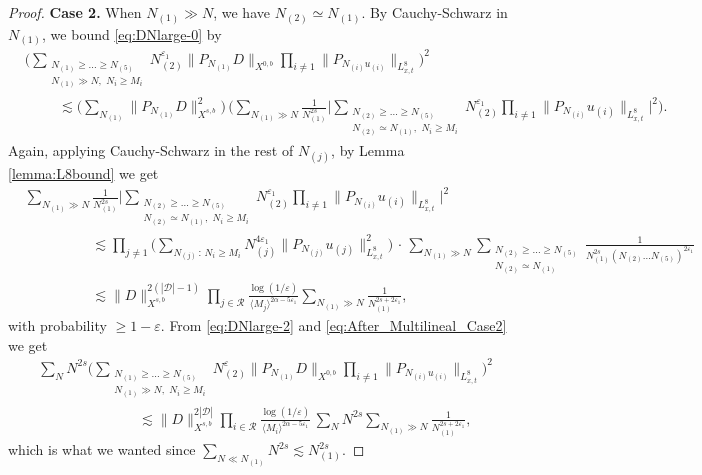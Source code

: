 \documentclass[11pt, xcolor = dvipsnames,reqno
]{amsart}
\theoremstyle{definition}
\theoremstyle{remark}
\begin{document}
\begin{proof}
\textbf{Case 2.}
When $N_{(1)} \gg N$, we have $N_{(2)} \simeq N_{(1)}$. By Cauchy-Schwarz in $N_{(1)}$,  we bound \eqref{eq:DNlarge-0} by
\begin{align}\label{eq:DNlarge-2}
    & \bigg( \sum_{\substack{N_{(1)} \geq \ldots \geq N_{(5)} \\ N_{(1)} \gg N, \, \, N_i \geq M_i}} N_{(2)}^{\varepsilon_1} \|P_{N_{(1)}} D \|_{X^{0,b}} \prod_{i \neq 1} \|P_{N_{(i)} u_{(i)}} \|_{L^8_{x,t}} \bigg)^2 \nonumber  \\
    & \hspace{1cm}
    \lesssim \Big( \sum_{N_{(1)}} \|P_{N_{(1)}} D\|_{X^{s,b}}^2 \Big) \,
    \Big( \sum_{N_{(1)} \gg N} \frac{1}{N_{(1)}^{2s}}  \Big| \sum_{\substack{  N_{(2)} \geq \ldots \geq N_{(5)} \\ N_{(2)} \simeq N_{(1)}, \, \,  N_i \geq M_i  }} N_{(2)}^{\varepsilon_1} \prod_{i \neq 1} \|P_{N_{(i)}} u_{(i)} \|_{L^8_{x,t}} \Big|^2 \Big).
\end{align}
Again, applying Cauchy-Schwarz in the rest of $N_{(j)}$, by Lemma \ref{lemma:L8bound} we get
\begin{align}\label{eq:After_Multilineal_Case2}
    & \sum_{N_{(1)} \gg N} 
    \frac{1}{N_{(1)}^{2s}}  \Big| \sum_{\substack{ N_{(2)} \geq \ldots \geq N_{(5)} \\ N_{(2)} \simeq N_{(1)}, \, \, N_i \geq M_i}} N_{(2)}^{\varepsilon_1} \prod_{i \neq 1} \|P_{N_{(i)}} u_{(i)} \|_{L^8_{x,t}} \Big|^2 \nonumber \\
    & \hspace{2cm}
    \lesssim \prod_{j \neq 1} \Big( \sum_{N_{(j)} \, : \, N_i \geq M_i} N_{(j)}^{4\varepsilon_1} \lVert P_{N_{(j)}} u_{(j)} \rVert_{L_{x,t}^8}^2 \Big) \, \cdot \, \sum_{N_{(1)} \gg N}   \sum_{\substack{ N_{(2)} \geq \ldots \geq N_{(5)} \\ N_{(2)} \simeq N_{(1)}}}\frac{1}{N_{(1)}^{2s} (N_{(2)} \ldots N_{(5)} )^{2\varepsilon_1}} \nonumber
    \\
    & \hspace{2cm} \lesssim \|D\|_{X^{s,b}}^{2(|\mathcal{D}| - 1)} \prod_{j\in \mathcal R} \frac{  \log (1/\varepsilon)}{\langle M_j \rangle^{2\alpha - 5\varepsilon_1}}  \sum_{ N_{(1)} \gg N}  \frac{1}{N_{(1)}^{2s + 2\varepsilon_1}}, 
\end{align}
with probability $\geq 1 - \varepsilon$. 
From \eqref{eq:DNlarge-2} and \eqref{eq:After_Multilineal_Case2} we get
\begin{align}
    & \sum_N N^{2s} \Big( 
    \sum_{\substack{N_{(1)} \geq \ldots \geq N_{(5)}  \\  N_{(1)} \gg N, \, \, N_i \geq M_i} } 
    N_{(2)}^{\varepsilon} \|P_{N_{(1)}} D \|_{X^{0,b}} \prod_{i \neq 1} \|P_{N_{(i)} u_{(i)}} \|_{L^8_{x,t}} \Big)^2 \\
    & \hspace{3cm}
    \lesssim \|D\|_{X^{s,b}}^{2|\mathcal{D}|} \prod_{i \in \mathcal{R}} \frac{\log (1/\varepsilon)}{ \langle M_i \rangle^{2 \alpha - 5\varepsilon_1}} \, 
    \sum_N N^{2s} \sum_{ N_{(1)} \gg N}  \frac{1}{N_{(1)}^{2s + 2\varepsilon_1}},
\end{align}
which is what we wanted
since $\sum_{N \ll N_{(1)}} N^{2s} \lesssim N_{(1)}^{2s}$. 
\end{proof}
\end{document}
